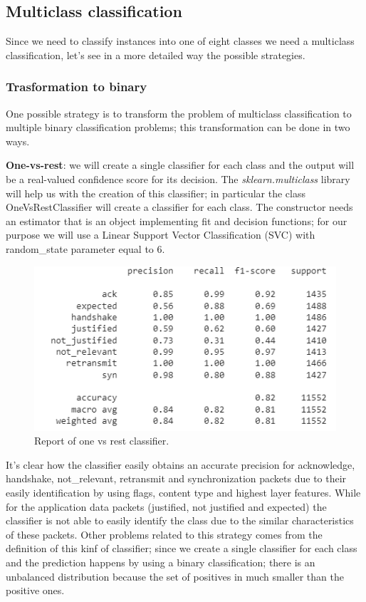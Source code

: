 \documentclass[sigconf]{acmart}
\begin{document}
    \subsection{Multiclass classification}
    Since we need to classify instances into one of eight classes we need a multiclass classification, let's see in a more detailed way the possible strategies.

    \subsubsection{Trasformation to binary}
    One possible strategy is to transform the problem of multiclass classification to multiple binary classification problems; this transformation can be done in two ways.

    \textbf{One-vs-rest}: we will create a single classifier for each class and the output will be a real-valued confidence score for its decision. The \textit{sklearn.multiclass} library will help us with the creation of this classifier; in particular the class OneVsRestClassifier will create a classifier for each class. The constructor needs an estimator that is an object implementing fit and decision functions; for our purpose we will use a Linear Support Vector Classification (SVC) with random\_state parameter equal to 6.
    \begin{figure}[h!]
        \includegraphics[width=\linewidth]{img/one_vs_rest_classifier.png}
        \caption{Report of one vs rest classifier.}
        \label{fig:one_vs_rest_classifier}
    \end{figure}
    It's clear how the classifier easily obtains an accurate precision for acknowledge, handshake, not\_relevant, retransmit and synchronization packets due to their easily identification by using flags, content type and highest layer features. While for the application data packets (justified, not justified and expected) the classifier is not able to easily identify the class due to the similar characteristics of these packets. Other problems related to this strategy comes from the definition of this kinf of classifier; since we create a single classifier for each class and the prediction happens by using a binary classification; there is an unbalanced distribution because the set of positives in much smaller than the positive ones.
\end{document}
